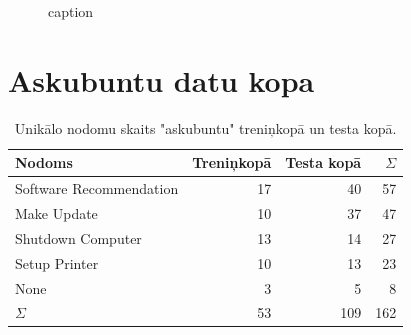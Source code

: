\begin{figure}[h] 
   \centering
   \caption{caption} 
   \label{fig:chatbot-xlm-all}
\end{figure}


\section{Askubuntu datu kopa}

\begin{table}[htbp]
  \centering
  \caption{Unikālo nodomu skaits "askubuntu" treniņkopā un testa kopā.}
    \begin{tabular}{lrrr} \toprule
    Nodoms & Treniņkopā & Testa kopā & $\Sigma$ \\\midrule
    Software Recommendation & 17    & 40 & 57 \\
    Make Update & 10    & 37 & 47 \\
    Shutdown Computer & 13    & 14 & 27 \\
    Setup Printer & 10    & 13 & 23\\
    None  & 3     & 5 & 8\\
   $\Sigma$ & 53    & 109 & 162 \\\bottomrule
    \end{tabular}%
  \label{tab:askubuntu-labels}%
\end{table}%


